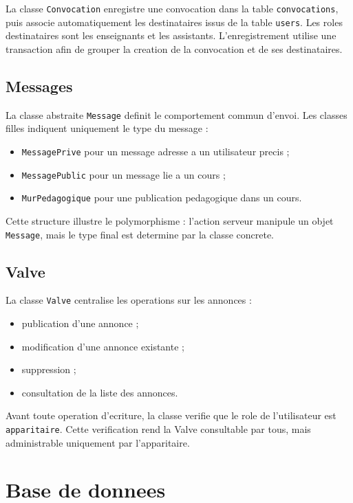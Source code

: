 \documentclass[12pt,a4paper]{article}
\begin{document}
La classe \texttt{Convocation} enregistre une convocation dans la table \texttt{convocations}, puis associe automatiquement les destinataires issus de la table \texttt{users}. Les roles destinataires sont les enseignants et les assistants. L'enregistrement utilise une transaction afin de grouper la creation de la convocation et de ses destinataires.

\subsection{Messages}

La classe abstraite \texttt{Message} definit le comportement commun d'envoi. Les classes filles indiquent uniquement le type du message :

\begin{itemize}
    \item \texttt{MessagePrive} pour un message adresse a un utilisateur precis ;
    \item \texttt{MessagePublic} pour un message lie a un cours ;
    \item \texttt{MurPedagogique} pour une publication pedagogique dans un cours.
\end{itemize}

Cette structure illustre le polymorphisme : l'action serveur manipule un objet \texttt{Message}, mais le type final est determine par la classe concrete.

\subsection{Valve}

La classe \texttt{Valve} centralise les operations sur les annonces :

\begin{itemize}
    \item publication d'une annonce ;
    \item modification d'une annonce existante ;
    \item suppression ;
    \item consultation de la liste des annonces.
\end{itemize}

Avant toute operation d'ecriture, la classe verifie que le role de l'utilisateur est \texttt{apparitaire}. Cette verification rend la Valve consultable par tous, mais administrable uniquement par l'apparitaire.

\section{Base de donnees}
\end{document}
